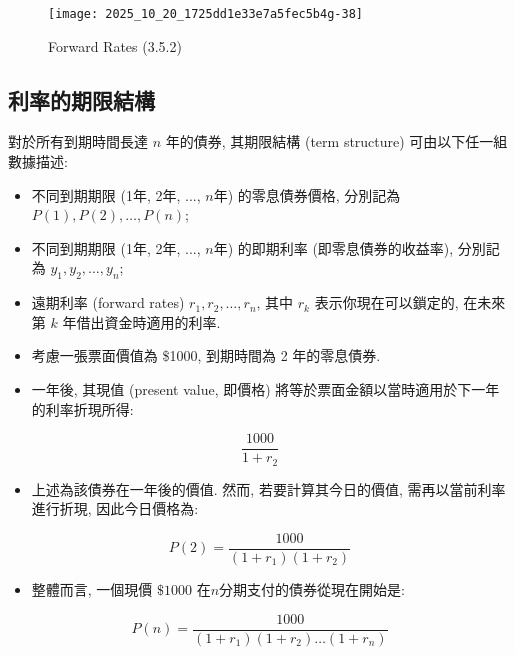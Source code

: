\documentclass[letterpaper]{article}
\begin{document}
		
		\begin{figure}[h]
			\begin{center}
				\caption{Forward Rates  (3.5.2) }
				\texttt{[image: 2025\_10\_20\_1725dd1e33e7a5fec5b4g-38]}
			\end{center}
		\end{figure}
		
		\subsection{利率的期限結構 }
		對於所有到期時間長達 \( n \) 年的債券, 其期限結構 (term structure) 可由以下任一組數據描述: 
		
		\begin{itemize}
			\item 不同到期期限 (1年, 2年, ..., \( n \)年) 的零息債券價格, 分別記為 \( P (1), P (2), \ldots, P (n) \); 
			\item 不同到期期限 (1年, 2年, ..., \( n \)年) 的即期利率 (即零息債券的收益率), 分別記為 \( y_{1}, y_{2}, \ldots, y_{n} \); 
			\item 遠期利率 (forward rates) \( r_{1}, r_{2}, \ldots, r_{n} \), 其中 \( r_{k} \) 表示你現在可以鎖定的, 在未來第 \( k \) 年借出資金時適用的利率.  
		\end{itemize}
		
		
		\begin{itemize}
			\item 考慮一張票面價值為 \$1000, 到期時間為 2 年的零息債券.  
			\item 一年後, 其現值 (present value, 即價格) 將等於票面金額以當時適用於下一年的利率折現所得: 
		\end{itemize}
		
		
		$$
		\frac{1000}{1+r_{2}}
		$$
		
		\begin{itemize}
			\item 上述為該債券在一年後的價值.  然而, 若要計算其今日的價值, 需再以當前利率進行折現, 因此今日價格為: 
		\end{itemize}
		
		$$
		P (2) =\frac{1000}{\left (1+r_{1}\right) \left (1+r_{2}\right) }
		$$
		
		\begin{itemize}
			\item 整體而言, 一個現價 $\$ 1000$ 在$n$分期支付的債券從現在開始是: 
		\end{itemize}
		
		$$
		P (n) =\frac{1000}{\left (1+r_{1}\right) \left (1+r_{2}\right) \ldots\left (1+r_{n}\right) }
		$$
		
\end{document}
